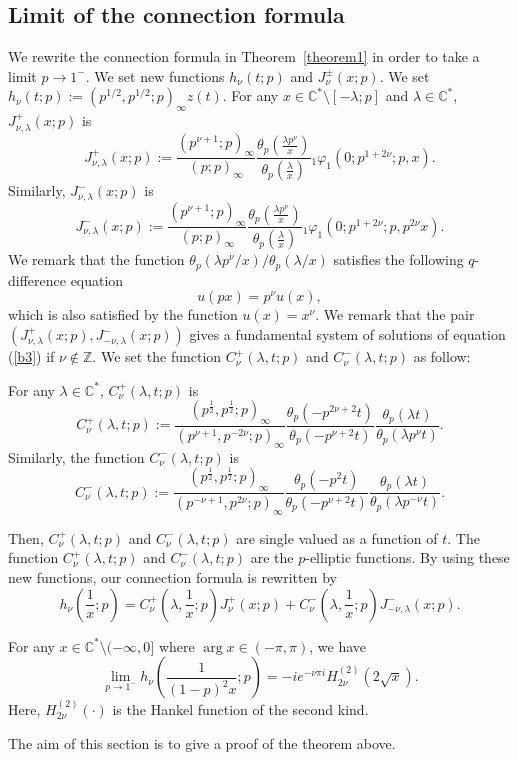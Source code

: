 \documentclass[pdftex]{sigma}
\begin{document}
\subsection{Limit of the connection formula}\label{section3.1}

We rewrite the connection formula in Theorem~\ref{theorem1} in order to take a limit $p\to 1^-$. We set new functions $h_\nu (t;p)$ and $J_\nu^{\pm}(x;p)$. We set $h_\nu (t;p):=(p^{1/2},p^{1/2};p)_\infty z(t)$.
For any $x\in\mathbb{C}^*\setminus [-\lambda ;p]$ and $\lambda\in\mathbb{C}^*$, $J_{\nu ,\lambda}^{+}(x;p)$ is
\[J_{\nu ,\lambda}^{+}(x;p):=\frac{(p^{\nu +1};p)_\infty}{(p;p)_\infty}\frac{\theta_p\left(\frac{\lambda p^{\nu}}{x}\right)}{\theta_p\left(\frac{\lambda}{x}\right)}{}_1\varphi_1\left(0;p^{1+2\nu};p,x\right).\]
Similarly, $J_{\nu ,\lambda}^{-}(x;p)$ is
\[J_{\nu ,\lambda}^{-}(x;p):=\frac{(p^{\nu +1};p)_\infty}{(p;p)_\infty}\frac{\theta_p\left(\frac{\lambda p^{\nu}}{x}\right)}{\theta_p\left(\frac{\lambda}{x}\right)}{}_1\varphi_1\left(0;p^{1+2\nu};p,p^{2\nu }x\right).\]
We remark that the function $\theta_p(\lambda p^\nu /x)/\theta_p(\lambda /x)$ satisf\/ies the following $q$-dif\/ference equation
\[
u(px)=p^\nu u(x),
\]
which is also satisf\/ied by the function $u(x)=x^\nu$. We remark that the pair
$(J_{\nu,\lambda}^{+}(x;p),J_{-\nu,\lambda}^{-}(x;p))$ gives a fundamental system of solutions of equation (\ref{b3}) if $\nu\not\in\mathbb{Z}$. We set the function $C^+_\nu (\lambda ,t;p)$ and $C^-_\nu (\lambda ,t;p)$ as follow:
\begin{definition}For any $\lambda\in\mathbb{C}^*$, $C^+_\nu (\lambda ,t;p)$ is
\[C^+_\nu (\lambda ,t;p):=
\frac{(p^{\frac{1}{2}},p^{\frac{1}{2}};p)_\infty}{(p^{\nu +1},p^{-2\nu};p)_\infty}\frac{\theta_p(-p^{2\nu +2}t)}{\theta_p(-p^{\nu +2}t)}\frac{\theta_p(\lambda t)}{\theta_p(\lambda p^\nu t)}.\]
Similarly, the function $C^-_\nu (\lambda ,t;p)$ is
\[C^-_\nu (\lambda ,t;p):=
\frac{(p^{\frac{1}{2}},p^{\frac{1}{2}};p)_\infty}{(p^{-\nu +1},p^{2\nu};p)_\infty}\frac{\theta_p(-p^2t)}{\theta_p(-p^{\nu +2}t)}\frac{\theta_p(\lambda t)}{\theta_p(\lambda p^{-\nu }t)}.\]
\end{definition}
Then, $C^+_\nu (\lambda ,t;p)$ and $C^-_\nu (\lambda ,t;p)$ are single valued as a function of $t$. The function $C^+_\nu (\lambda ,t;p)$ and $C^-_\nu (\lambda ,t;p)$ are the $p$-elliptic functions.
By using these new functions, our connection formula is rewritten by
\[h_\nu\left(\frac{1}{x};p\right)=C_{\nu}^+\left(\lambda ,\frac{1}{x};p\right)J_{\nu}^{+}(x;p)
+C_\nu^-\left(\lambda ,\frac{1}{x};p\right)J_{-\nu ,\lambda}^{-}(x;p).\]
\begin{theorem}\label{limitbessel}For any $x\in \mathbb{C}^*\setminus (-\infty ,0]$  where $\arg x\in (-\pi ,\pi )$, we have
\[\lim_{p\to 1^-}h_\nu \left(\frac{1}{(1-p)^2x};p\right)
=-ie^{-\nu\pi i}H_{2\nu}^{(2)}(2\sqrt{x}).\]
Here, $H_{2\nu}^{(2)}(\cdot )$ is the Hankel function of the second kind.
\end{theorem}
The aim of this section is to give a proof of the theorem above.
\end{document}
